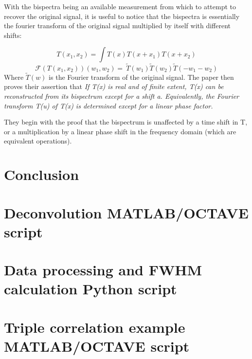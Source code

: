 \documentclass[a4paper]{article}
\begin{document}
With the bispectra being an available measurement from which to attempt to recover the original signal,  it is useful to notice that the bispectra is essentially the fourier transform of the original signal multiplied by itself with different shifts:

\[T\left(x_1,x_2\right)=  \int T\left(x\right)T\left(x+x_1\right)T(x+x_2)\]
\[\mathcal{F}\left(T\left(x_1,x_2\right)\right)\left(w_1,w_2\right)=\ \widetilde{T}(w_1)\widetilde{T}(w_2)\widetilde{T}(-w_1-w_2)\]
Where $\widetilde{T}(w)$ is the Fourier transform of the original signal. The paper then proves their assertion that \textit{If T(x) is real and of finite extent, T(x) can be reconstructed from its bispectrum except for a shift a. Equivalently, the Fourier transform T(u) of T(x) is determined except for a linear phase factor.}

They begin with the proof that the bispectrum is unaffected by a time shift in T, or a multiplication by a linear phase shift in the frequency domain (which are equivalent operations).

\section{Conclusion}

\printbibliography

\newpage
\begin{appendices}
\section{Deconvolution MATLAB/OCTAVE script}


\newpage
\section{Data processing and FWHM calculation Python script}


\newpage
\section{Triple correlation example MATLAB/OCTAVE script}

\end{appendices}
\end{document}
